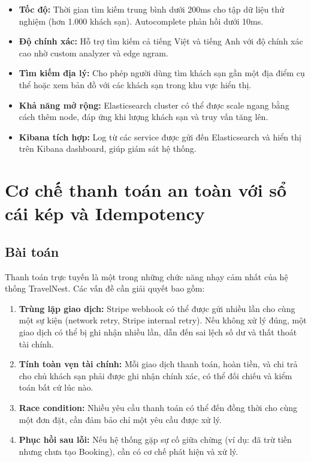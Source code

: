 \documentclass[13pt,a4paper,twoside]{report}
\begin{document}
\begin{itemize}
  \item \textbf{Tốc độ:} Thời gian tìm kiếm trung bình dưới 200ms cho tập dữ liệu thử nghiệm (hơn 1.000 khách sạn). Autocomplete phản hồi dưới 10ms.
  \item \textbf{Độ chính xác:} Hỗ trợ tìm kiếm cả tiếng Việt và tiếng Anh với độ chính xác cao nhờ custom analyzer và edge ngram.
  \item \textbf{Tìm kiếm địa lý:} Cho phép người dùng tìm khách sạn gần một địa điểm cụ thể hoặc xem bản đồ với các khách sạn trong khu vực hiển thị.
  \item \textbf{Khả năng mở rộng:} Elasticsearch cluster có thể được scale ngang bằng cách thêm node, đáp ứng khi lượng khách sạn và truy vấn tăng lên.
  \item \textbf{Kibana tích hợp:} Log từ các service được gửi đến Elasticsearch và hiển thị trên Kibana dashboard, giúp giám sát hệ thống.
\end{itemize}

\section{Cơ chế thanh toán an toàn với sổ cái kép và Idempotency}

\subsection{Bài toán}

Thanh toán trực tuyến là một trong những chức năng nhạy cảm nhất của hệ thống TravelNest. Các vấn đề cần giải quyết bao gồm:

\begin{enumerate}
  \item \textbf{Trùng lặp giao dịch:} Stripe webhook có thể được gửi nhiều lần cho cùng một sự kiện (network retry, Stripe internal retry). Nếu không xử lý đúng, một giao dịch có thể bị ghi nhận nhiều lần, dẫn đến sai lệch số dư và thất thoát tài chính.
  \item \textbf{Tính toàn vẹn tài chính:} Mỗi giao dịch thanh toán, hoàn tiền, và chi trả cho chủ khách sạn phải được ghi nhận chính xác, có thể đối chiếu và kiểm toán bất cứ lúc nào.
  \item \textbf{Race condition:} Nhiều yêu cầu thanh toán có thể đến đồng thời cho cùng một đơn đặt, cần đảm bảo chỉ một yêu cầu được xử lý.
  \item \textbf{Phục hồi sau lỗi:} Nếu hệ thống gặp sự cố giữa chừng (ví dụ: đã trừ tiền nhưng chưa tạo Booking), cần có cơ chế phát hiện và xử lý.
\end{enumerate}
\end{document}

